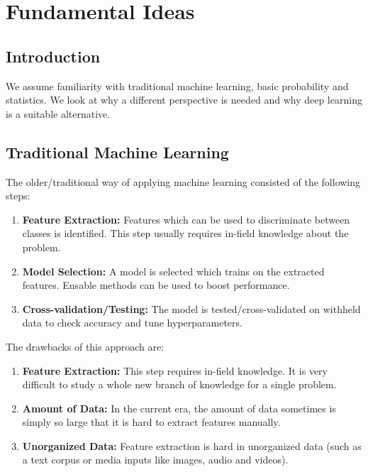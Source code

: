 \chapter{Fundamental Ideas}
\section{Introduction}
We assume familiarity with traditional machine learning, basic probability and statistics. We look at why a different perspective
is needed and why deep learning is a suitable alternative.

\section{Traditional Machine Learning}
The older/traditional way of applying machine learning consisted of the following steps:
\begin{enumerate}
    \item \textbf{Feature Extraction:} Features which can be used to discriminate between classes is identified. This step usually requires in-field knowledge about the problem.
    \item \textbf{Model Selection: } A model is selected which trains on the extracted features. Ensable
    methods can be used to boost performance.
    \item \textbf{Cross-validation/Testing: }The model is tested/cross-validated on withheld data to check accuracy and tune hyperparameters.
\end{enumerate}
The drawbacks of this approach are:
\begin{enumerate}
    \item \textbf{Feature Extraction: }This step requires in-field knowledge. It is very difficult to study a
    whole new branch of knowledge for a single problem.
    \item \textbf{Amount of Data: }In the current era, the amount of data sometimes is simply so large
    that it is hard to extract features manually.
    \item \textbf{Unorganized Data: } Feature extraction is hard in unorganized data (such as a text corpus or media inputs like images, audio and videos).
\end{enumerate}
